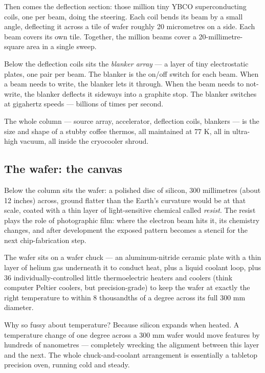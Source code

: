 \documentclass[11pt,letterpaper]{article}
\begin{document}
Then comes the deflection section: those million tiny YBCO superconducting coils, one per beam, doing the steering. Each coil bends its beam by a small angle, deflecting it across a tile of wafer roughly 20 micrometres on a side. Each beam covers its own tile. Together, the million beams cover a 20-millimetre-square area in a single sweep.

Below the deflection coils sits the \emph{blanker array} --- a layer of tiny electrostatic plates, one pair per beam. The blanker is the on/off switch for each beam. When a beam needs to write, the blanker lets it through. When the beam needs to not-write, the blanker deflects it sideways into a graphite stop. The blanker switches at gigahertz speeds --- billions of times per second.

The whole column --- source array, accelerator, deflection coils, blankers --- is the size and shape of a stubby coffee thermos, all maintained at 77 K, all in ultra-high vacuum, all inside the cryocooler shroud.

\subsection{The wafer: the canvas}

Below the column sits the wafer: a polished disc of silicon, 300 millimetres (about 12 inches) across, ground flatter than the Earth's curvature would be at that scale, coated with a thin layer of light-sensitive chemical called \emph{resist}. The resist plays the role of photographic film: where the electron beam hits it, its chemistry changes, and after development the exposed pattern becomes a stencil for the next chip-fabrication step.

The wafer sits on a wafer chuck --- an aluminum-nitride ceramic plate with a thin layer of helium gas underneath it to conduct heat, plus a liquid coolant loop, plus 36 individually-controlled little thermoelectric heaters and coolers (think computer Peltier coolers, but precision-grade) to keep the wafer at exactly the right temperature to within 8 thousandths of a degree across its full 300 mm diameter.

Why so fussy about temperature? Because silicon expands when heated. A temperature change of one degree across a 300 mm wafer would move features by hundreds of nanometres --- completely wrecking the alignment between this layer and the next. The whole chuck-and-coolant arrangement is essentially a tabletop precision oven, running cold and steady.
\end{document}
